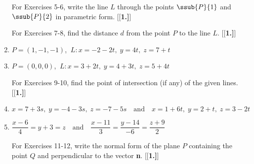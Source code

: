 \begin{enumerate}[\bfseries 1.]
\par\noindent For Exercises 5-6, write the line $L$ through the points $\ssub{P}{1}$ and $\ssub{P}{2}$ in parametric
form.
[{[\bfseries 1.]}]
\par\noindent For Exercises 7-8, find the distance $d$ from the point $P$ to the line $L$.
[{[\bfseries 1.]}]
 \item $P = (1,-1,-1)$, $~L: x = -2 - 2t, \; y = 4t, \; z = 7 + t$
 \item $P = (0,0,0)$, $~L: x = 3 + 2t, \; y = 4 + 3t, \; z = 5 + 4t$
\par\noindent For Exercises 9-10, find the point of intersection (if any) of the given lines.
[{[\bfseries 1.]}]
 \item $x = 7 + 3s, \; y = -4 - 3s, \; z = -7 - 5s \quad \text{and} \quad x = 1 + 6t, \; y = 2 + t, \; z = 3 - 2t$
 \item $\dfrac{x - 6}{4} = y + 3 = z \quad \text{and} \quad \dfrac{x - 11}{3} = \dfrac{y - 14}{-6} =
  \dfrac{z + 9}{2}$
\par\noindent For Exercises 11-12, write the normal form of the plane $P$ containing the point $Q$ and
perpendicular to the vector \textbf{n}.
[{[\bfseries 1.]}]

\end{enumerate}
